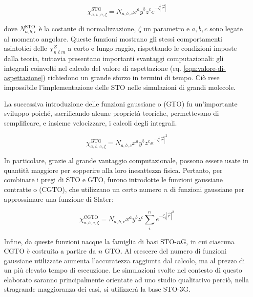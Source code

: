 \begin{equation}\label{eqn:STO}
    \chi^{\text{STO}}_{a,b,c,\zeta} = N_{a,b,c} x^a y^b z^c e^{-\zeta |\vec{r}|}
\end{equation}


dove $N^{\text{STO}}_{a,b,c}$ è la costante di normalizzazione, $\zeta$ un parametro e $a,b,c$ sono legate al momento angolare.
Queste funzioni mostrano gli stessi comportamenti asintotici delle $\chi_{n\ell m}^{Z}$ a corto e lungo raggio, rispettando le condizioni imposte dalla teoria, tuttavia presentano importanti svantaggi computazionali: gli integrali coinvolti nel calcolo del valore di aspettazione (eq. \ref{eqn:valore-di-aspettazione}) richiedono un grande sforzo in termini di tempo. Ciò rese impossibile l'implementazione delle STO nelle simulazioni di grandi molecole.

La successiva introduzione delle funzioni gaussiane o  (GTO) fu un'importante sviluppo poiché, sacrificando alcune proprietà teoriche, permettevano di semplificare, e insieme velocizzare, i calcoli degli integrali.

\begin{equation}\label{eqn:GTO}
    \chi^{\text{GTO}}_{a,b,c,\zeta} = N_{a,b,c} x^a y^b z^c e^{-\zeta |\vec{r}|^2}
\end{equation}

In particolare, grazie al grande vantaggio computazionale, possono essere usate in quantità maggiore per sopperire alla loro inesattezza fisica. Pertanto, per combinare i pregi di STO e GTO, furono introdotte le funzioni gaussiane contratte o  (CGTO), che utilizzano un certo numero $n$ di funzioni gaussiane per approssimare una funzione di Slater:

\begin{equation}\label{eqn:CGTO}
    \chi^{\text{CGTO}}_{a,b,c,\zeta} = N_{a,b,c} x^a y^b z^c 
    \sum_{i}^{n} e^{-\zeta_i |\vec{r}|^2}
\end{equation}

Infine, da queste funzioni nacque la famiglia di basi STO-$n$G, in cui ciascuna CGTO è costruita a partire da $n$ GTO. Al crescere del numero di funzioni gaussiane utilizzate aumenta l'accuratezza raggiunta dal calcolo, ma al prezzo di un più elevato tempo di esecuzione.
Le simulazioni svolte nel contesto di questo elaborato saranno principalmente orientate ad uno studio qualitativo perciò, nella stragrande maggioranza dei casi, si utilizzerà la base STO-3G.


